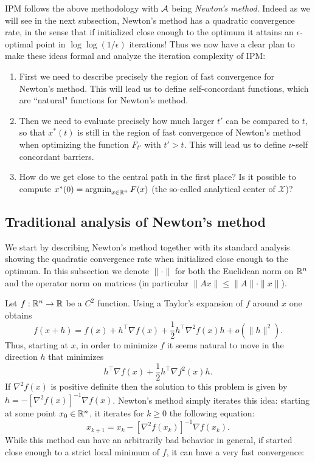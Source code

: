 IPM follows the above methodology with $\mathcal{A}$ being {\em Newton's method}. Indeed as we will see in the next subsection, Newton's method has a quadratic convergence rate, in the sense that if initialized close enough to the optimum it attains an $\epsilon$-optimal point in $\log\log(1/\epsilon)$ iterations! Thus we now have a clear plan to make these ideas formal and analyze the iteration complexity of IPM:
\begin{enumerate}
\item First we need to describe precisely the region of fast convergence for Newton's method. This will lead us to define self-concordant functions, which are ``natural" functions for Newton's method.
\item Then we need to evaluate precisely how much larger $t'$ can be compared to $t$, so that $x^*(t)$ is still in the region of fast convergence of Newton's method when optimizing the function $F_{t'}$ with $t'>t$. This will lead us to define $\nu$-self concordant barriers.
\item How do we get close to the central path in the first place? Is it possible to compute $x^*(0) = \mathop{\mathrm{argmin}}_{x \in \mathbb{R}^n} F(x)$ (the so-called analytical center of $\mathcal{X}$)?
\end{enumerate}

\subsection{Traditional analysis of Newton's method} \label{sec:tradanalysisNM}
We start by describing Newton's method together with its standard analysis showing the quadratic convergence rate when initialized close enough to the optimum. In this subsection we denote $\|\cdot\|$ for both the Euclidean norm on $\mathbb{R}^n$ and the operator norm on matrices (in particular $\|A x\| \leq \|A\| \cdot \|x\|$).

Let $f: \mathbb{R}^n \rightarrow \mathbb{R}$ be a $C^2$ function. 
Using a Taylor's expansion of $f$ around $x$ one obtains
$$f(x+h) = f(x) + h^{\top} \nabla f(x) + \frac12 h^{\top} \nabla^2 f(x) h + o(\|h\|^2) .$$
Thus, starting at $x$, in order to minimize $f$ it seems natural to move in the direction $h$ that minimizes 
$$h^{\top} \nabla f(x) + \frac12 h^{\top} \nabla f^2(x) h .$$
If $\nabla^2 f(x)$ is positive definite then the solution to this problem is given by $h = - [\nabla^2 f(x)]^{-1} \nabla f(x)$. Newton's method simply iterates this idea: starting at some point $x_0 \in \mathbb{R}^n$, it iterates for $k \geq 0$ the following equation:
$$x_{k+1} = x_k  - [\nabla^2 f(x_k)]^{-1} \nabla f(x_k) .$$
While this method can have an arbitrarily bad behavior in general, if started close enough to a strict local minimum of $f$, it can have a very fast convergence:

